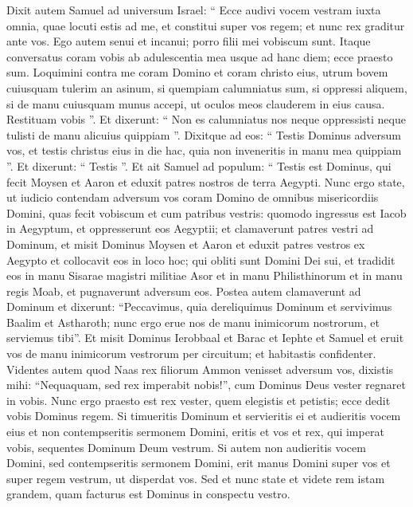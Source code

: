 \begin{biblechapter}
\begin{biblechapter}
\begin{biblechapter}
\begin{biblechapter}
\begin{biblechapter}
\begin{biblechapter}
\begin{biblechapter}
\begin{biblechapter}
\begin{biblechapter}
\begin{biblechapter}
\begin{biblechapter}
\begin{biblechapter}
\verse Dixit autem Samuel ad universum Israel: “ Ecce audivi vocem vestram iuxta omnia, quae locuti estis ad me, et constitui super vos regem; 
\verse et nunc rex graditur ante vos. Ego autem senui et incanui; porro filii mei vobiscum sunt. Itaque conversatus coram vobis ab adulescentia mea usque ad hanc diem; 
\verse ecce praesto sum. Loquimini contra me coram Domino et coram christo eius, utrum bovem cuiusquam tulerim an asinum, si quempiam calumniatus sum, si oppressi aliquem, si de manu cuiusquam munus accepi, ut oculos meos clauderem in eius causa. Restituam vobis ”. 
\verse Et dixerunt: “ Non es calumniatus nos neque oppressisti neque tulisti de manu alicuius quippiam ”. 
\verse Dixitque ad eos: “ Testis Dominus adversum vos, et testis christus eius in die hac, quia non inveneritis in manu mea quippiam ”. Et dixerunt: “ Testis ”.
 \verse Et ait Samuel ad populum: “ Testis est Dominus, qui fecit Moysen et Aaron et eduxit patres nostros de terra Aegypti. 
\verse Nunc ergo state, ut iudicio contendam adversum vos coram Domino de omnibus misericordiis Domini, quas fecit vobiscum et cum patribus vestris: 
\verse quomodo ingressus est Iacob in Aegyptum, et oppresserunt eos Aegyptii; et clamaverunt patres vestri ad Dominum, et misit Dominus Moysen et Aaron et eduxit patres vestros ex Aegypto et collocavit eos in loco hoc; 
\verse qui obliti sunt Domini Dei sui, et tradidit eos in manu Sisarae magistri militiae Asor et in manu Philisthinorum et in manu regis Moab, et pugnaverunt adversum eos.
 \verse Postea autem clamaverunt ad Dominum et dixerunt: “Peccavimus, quia dereliquimus Dominum et servivimus Baalim et Astharoth; nunc ergo erue nos de manu inimicorum nostrorum, et serviemus tibi”. 
\verse Et misit Dominus Ierobbaal et Barac et Iephte et Samuel et eruit vos de manu inimicorum vestrorum per circuitum; et habitastis confidenter.
 \verse Videntes autem quod Naas rex filiorum Ammon venisset adversum vos, dixistis mihi: “Nequaquam, sed rex imperabit nobis!”, cum Dominus Deus vester regnaret in vobis. 
\verse Nunc ergo praesto est rex vester, quem elegistis et petistis; ecce dedit vobis Dominus regem. 
\verse Si timueritis Dominum et servieritis ei et audieritis vocem eius et non contempseritis sermonem Domini, eritis et vos et rex, qui imperat vobis, sequentes Dominum Deum vestrum. 
\verse Si autem non audieritis vocem Domini, sed contempseritis sermonem Domini, erit manus Domini super vos et super regem vestrum, ut disperdat vos.
 \verse Sed et nunc state et videte rem istam grandem, quam facturus est Dominus in conspectu vestro. 

\end{biblechapter}
\end{biblechapter}
\end{biblechapter}
\end{biblechapter}
\end{biblechapter}
\end{biblechapter}
\end{biblechapter}
\end{biblechapter}
\end{biblechapter}
\end{biblechapter}
\end{biblechapter}
\end{biblechapter}
